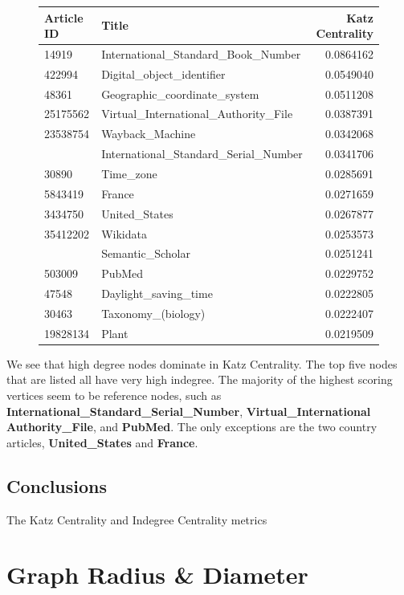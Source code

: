 \documentclass{article}
\begin{document}
\begin{figure}[H]
    \centering
    \begin{tabular}{llr}
        \toprule
        Article ID & Title & Katz Centrality\\
        \midrule
        14919 & International\_Standard\_Book\_Number & 0.0864162\\
        422994 & Digital\_object\_identifier & 0.0549040\\
        48361 & Geographic\_coordinate\_system & 0.0511208\\
        25175562 & Virtual\_International\_Authority\_File & 0.0387391\\
    23538754 & Wayback\_Machine & 0.0342068\\
    \addlinespace
    234930 & International\_Standard\_Serial\_Number & 0.0341706\\
    30890 & Time\_zone & 0.0285691\\
    5843419 & France & 0.0271659\\
    3434750 & United\_States & 0.0267877\\
    35412202 & Wikidata & 0.0253573\\
    \addlinespace
    48455863 & Semantic\_Scholar & 0.0251241\\
    503009 & PubMed & 0.0229752\\
    47548 & Daylight\_saving\_time & 0.0222805\\
    30463 & Taxonomy\_(biology) & 0.0222407\\
    19828134 & Plant & 0.0219509\\
    \bottomrule
    \end{tabular}
\end{figure}

We see that high degree nodes dominate in Katz Centrality.
The top five nodes that are listed all have very high indegree.
The majority of the highest scoring vertices seem to be reference nodes, such as \textbf{International\_Standard\_Serial\_Number}, \textbf{Virtual\_International Authority\_File}, and \textbf{PubMed}.
The only exceptions are the two country articles, \textbf{United\_States} and \textbf{France}.

\subsection*{Conclusions}

The Katz Centrality and Indegree Centrality metrics


\section{Graph Radius \& Diameter}
\end{document}
